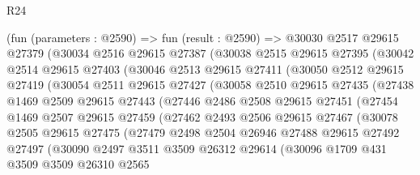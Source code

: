 \begin{lexlean}{R24}
\begin{coremodule}
        (fun (parameters : @2590) =>
        fun (result : @2590) =>
        @30030
          @2517
          @29615
          @27379
          (@30034
            @2516
            @29615
            @27387
            (@30038
              @2515
              @29615
              @27395
              (@30042
                @2514
                @29615
                @27403
                (@30046
                  @2513
                  @29615
                  @27411
                  (@30050
                    @2512
                    @29615
                    @27419
                    (@30054
                      @2511
                      @29615
                      @27427
                      (@30058
                        @2510
                        @29615
                        @27435
                        (@27438
                          @1469
                          @2509
                          @29615
                          @27443
                          (@27446
                            @2486
                            @2508
                            @29615
                            @27451
                            (@27454
                              @1469
                              @2507
                              @29615
                              @27459
                              (@27462
                                @2493
                                @2506
                                @29615
                                @27467
                                (@30078
                                  @2505
                                  @29615
                                  @27475
                                  (@27479
                                    @2498
                                    @2504
                                    @26946
                                    @27488
                                    @29615
                                    @27492
                                    @27497
                                    (@30090
                                      @2497
                                      @3511
                                      @3509
                                      @26312
                                      @29614
                                      (@30096
                                        @1709
                                        @431
                                        @3509
                                        @3509
                                        @26310
                                        @2565

\end{coremodule}
\end{lexlean}
